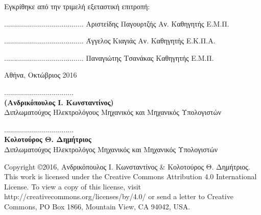 \documentclass[
11pt, %
english, %
singlespacing, %
parskip, %
headsepline, %
]{MastersDoctoralThesis} %
\begin{document}
\begin{center}
\noindent
\small
Εγκρίθηκε από την τριμελή εξεταστική επιτροπή:

\vfill

\begin{center}
\scriptsize
\parbox[b]{0.3\textwidth} {\center
	........................................
	Αριστείδης Παγουρτζής
	Αν. Καθηγητής Ε.Μ.Π.
}
\parbox[b]{0.3\textwidth} {\center
	........................................
	Άγγελος Κιαγιάς
	Αν. Καθηγητής Ε.Κ.Π.Α.
}
\parbox[b]{0.3\textwidth} {\center
	........................................
	Παναγιώτης Τσανάκας
	Καθηγητής Ε.Μ.Π.
}
\end{center}


\vfill
{\large Αθήνα, Οκτώβριος 2016}\\[4cm] %

\end{center}


\pagebreak


\vspace{30ex}
\noindent
................................... \\
\textbf{(Ανδρικόπουλος Ι. Κωνσταντίνος)} \\
Διπλωματούχος Ηλεκτρολόγους Μηχανικός και Μηχανικός Υπολογιστών \\
\vspace{8ex}

\noindent
................................... \\
\textbf{Κολοτούρος Θ. Δημήτριος} \\
Διπλωματούχος Ηλεκτρολόγος Μηχανικός και Μηχανικός Υπολογιστών \\
\vspace{8ex}

\vfill

\small
\noindent
Copyright \copyright \hspace{1em}2016, Ανδρικόπουλος Ι. Κωνσταντίνος \& Κολοτούρος Θ. Δημήτριος.\\

This work is licensed under the Creative Commons Attribution 4.0 International License. To view a copy of this license, visit http://creativecommons.org/licenses/by/4.0/ or send a letter to Creative Commons, PO Box 1866, Mountain View, CA 94042, USA. \\[0.2cm]
\pagebreak
\end{document}
